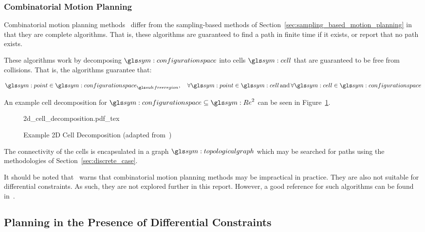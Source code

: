 		\subsubsection{Combinatorial Motion Planning}%
		\label{sec:combinatorial_motion_planning}

			Combinatorial motion planning
			methods~%
			\cite{bib:planning:planning_algorithms}%
			\cite{bib:planning:robot_motion_planning}
			differ from the
			sampling-based methods of
			Section~\ref{sec:sampling_based_motion_planning} in that they are
			complete algorithms. That is, these algorithms are guaranteed to
			find a path in finite time if it exists, or report that no path
			exists.

			These algorithms work by decomposing $\configurationspace$ into
			cells $\cell$ that are guaranteed to be free from collisions. That
			is, the algorithms guarantee that:

			\begin{equation}
				\point\in\configurationspace_{\freeregion},
				\quad
				\forall\point\in\cell \, \text{and} \, \forall\cell\in\configurationspace
			\end{equation}

			An example cell decomposition for $\configurationspace\subseteq\Re^2$ can be seen
			in Figure~\ref{fig:example_2d_cell_decomposition}.

			\begin{figure}[hb]
				\centering
				\def\svgwidth{\columnwidth}
				{2d_cell_decomposition.pdf_tex}
				\caption[Example 2D Cell Decomposition]
				{%
					Example 2D Cell Decomposition
					(adapted from~\cite[][page 269]
						{bib:planning:planning_algorithms})
				}%
				\label{fig:example_2d_cell_decomposition}
			\end{figure}

			The connectivity of the cells is encapsulated in a graph
			$\topologicalgraph$ which may be searched for paths using the
			methodologies of Section~\ref{sec:discrete_case}.

			It should be noted that~\cite{bib:planning:planning_algorithms}
			warns that combinatorial motion planning methods may be impractical
			in practice. They are also not suitable for differential
			constraints.  As such, they are not explored further in this report.
			However, a good reference for such algorithms can be found
			in~\cite{bib:planning:robot_motion_planning}.

	\subsection{Planning in the Presence of Differential Constraints}%
	\label{sec:planning_in_the_presence_of_differential_constraints}


